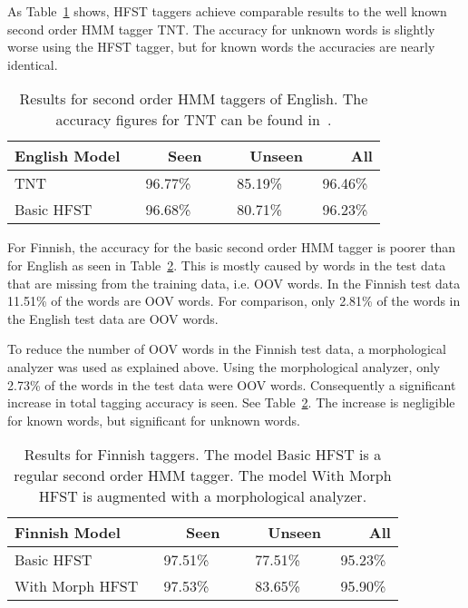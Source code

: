 \documentclass[draft]{llncs}
\begin{document}
As Table~\ref{eng-tagging-acc} shows, HFST taggers achieve comparable
results to the well known second order HMM tagger TNT. The accuracy
for unknown words is slightly worse using the HFST tagger, but for
known words the accuracies are nearly identical.

\begin{table}
  \caption{Results for second order HMM taggers of English. The accuracy
    figures for TNT can be found in~\cite{Halascy:2007}.}\label{eng-tagging-acc}
  \begin{center}
    \begin{tabular}{lccc}
      \hline
      English Model       & ~~~~Seen & ~~~~Unseen & ~~~~All \\
      \hline
      TNT         & 96.77\%  &    85.19\% & 96.46\% \\
      Basic HFST  & 96.68\%  &    80.71\% & 96.23\% \\
      \hline
    \end{tabular}
  \end{center}
\end{table}

For Finnish, the accuracy for the basic second order HMM tagger is
poorer than for English as seen in Table~\ref{fin-tagging-acc}. This
is mostly caused by words in the test data that are
missing from the training data, i.e. OOV words. In the Finnish test
data 11.51\% of the words are OOV words. For comparison, only 2.81\%
of the words in the English test data are OOV words.

To reduce the number of OOV words in the Finnish test data, a
morphological analyzer was used as explained above. Using the
morphological analyzer, only 2.73\% of the words in the test data
were OOV words. Consequently a significant increase in total tagging
accuracy is seen. See Table~\ref{fin-tagging-acc}. The increase is
negligible for known words, but significant for unknown words.

\begin{table}
  \caption{Results for Finnish taggers. The model Basic HFST is a
    regular second order HMM tagger. The model With Morph HFST is
    augmented with a morphological analyzer.}\label{fin-tagging-acc}
  \begin{center}
    \begin{tabular}{lccc}
      \hline 
      Finnish Model            & ~~~~Seen & ~~~~Unseen & ~~~~All \\
      \hline 
      Basic HFST       &  97.51\% &    77.51\% & 95.23\% \\
      With Morph HFST  &  97.53\% &    83.65\% & 95.90\% \\
      \hline
    \end{tabular}
  \end{center}
\end{table}
\end{document}

